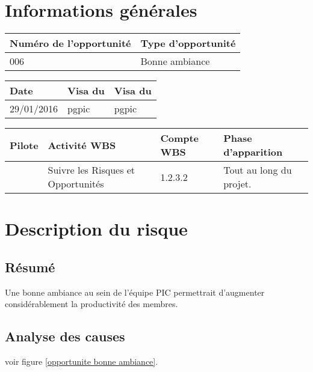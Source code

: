 \section*{Informations générales}
 
\begin{table}[h]
\centering
	\begin{tabularx}{16.8cm}{|X|X|}
	\hline
	\rowcolor{gray!40} Numéro de l'opportunité & Type d'opportunité \\
	\hline
	006 & Bonne ambiance \\
	\hline
	\end{tabularx}
\end{table}

\begin{table}[h]
\centering
	\begin{tabularx}{16.8cm}{|X|X|X|}
	\hline
	\rowcolor{gray!40} Date & Visa du \RQ & Visa du \CP \\
	\hline
	 29/01/2016 & pgpic & pgpic \\
	\hline
	\end{tabularx}
\end{table}

\begin{table}[h]
\centering
	\begin{tabularx}{16.8cm}{|X|X|X|X|}
	\hline
	\rowcolor{gray!40} Pilote & Activité WBS & Compte WBS & Phase d'apparition \\
	\hline
	 \Kafui & Suivre les Risques et Opportunités & 1.2.3.2 & Tout au long du projet.\\
	\hline
	\end{tabularx}
\end{table}

\section*{Description du risque}

\subsection*{Résumé}
	Une bonne ambiance au sein de l'équipe PIC permettrait d'augmenter considérablement la productivité des membres. \\
	
\subsection*{Analyse des causes}
	voir figure \ref{opportunite bonne ambiance}.

